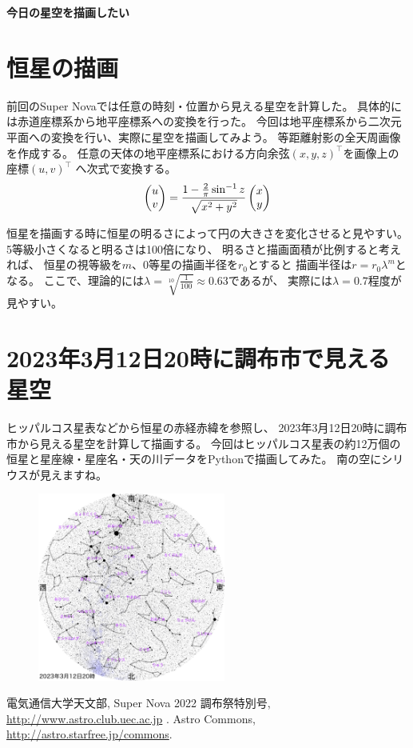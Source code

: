 \documentclass[
  paper=a4 , %
  book , %
  openany, %
  fontsize=10pt , %
  jafontsize=10pt, %
  gutter=25.6mm, %
  head_space=20mm, %
  foot_space=20mm, %
  line_length=165mm, %
  jlreq_warnings , %
]{jsarticle}
\def\mylove{\K=0 \loop\ifnum\K<100                                                  
女の子が好きだった...。\advance\K by1\repeat}
\begin{document}
\centerline{\Large{\bf 今日の星空を描画したい}}
\vspace{-3mm}
\section*{恒星の描画}
\vspace{-2mm}
前回のSuper Nova\cite{a}では任意の時刻・位置から見える星空を計算した。
具体的には赤道座標系から地平座標系への変換を行った。
今回は地平座標系から二次元平面への変換を行い、実際に星空を描画してみよう。
等距離射影の全天周画像を作成する。
任意の天体の地平座標系における方向余弦$(x,y,z)^\top$を画像上の座標$(u,v)^\top$
へ次式で変換する。
\vspace{-3mm}
\begin{align}
	\begin{pmatrix}
		u \\ v \\
	\end{pmatrix}
	=
	\frac{1-\frac{2}{\pi} \sin^{-1}{z}}{\sqrt{x^2 + y^2}}
	\begin{pmatrix}
		x \\ y \\
	\end{pmatrix}
	\notag
\end{align}

恒星を描画する時に恒星の明るさによって円の大きさを変化させると見やすい。
5等級小さくなると明るさは100倍になり、
明るさと描画面積が比例すると考えれば、
恒星の視等級を$m$、0等星の描画半径を$r_0$とすると
描画半径は$r = r_0 \lambda^m$となる。
ここで、理論的には$\lambda = \sqrt[10]{\frac{1}{100}} \approx 0.63$であるが、
実際には$\lambda = 0.7$程度が見やすい。

\vspace{-3mm}
\section*{2023年3月12日20時に調布市で見える星空}
\vspace{-2mm}
ヒッパルコス星表などから恒星の赤経赤緯を参照し、
2023年3月12日20時に調布市から見える星空を計算して描画する。
今回はヒッパルコス星表の約12万個の恒星と星座線・星座名・天の川データ\cite{b}をPythonで描画してみた。
南の空にシリウスが見えますね。%
\begin{figure}[h]
	\centering
	\leavevmode
	\includegraphics[width=0.55\textwidth]{piari.png}
\end{figure}

\vspace{-3mm}
\begin{thebibliography}{1}
	 電気通信大学天文部, Super Nova 2022 調布祭特別号, \url{http://www.astro.club.uec.ac.jp} .
	 Astro Commons, \url{http://astro.starfree.jp/commons}.
\end{thebibliography}
\end{document}
